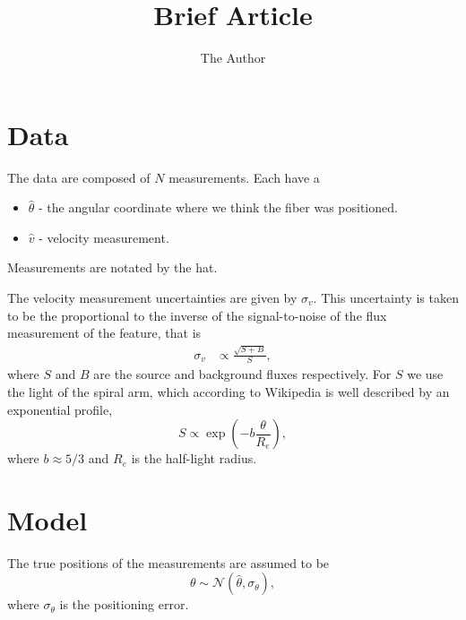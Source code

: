 \documentclass[11pt, oneside]{article}   	%
\title{Brief Article}
\author{The Author}
\begin{document}
\maketitle

\section{Data}
The data are composed of $N$ measurements.  Each have a
\begin{itemize}
\item $\hat{\theta}$ - the angular coordinate where we think the fiber was positioned.
\item $\hat{v}$ - velocity measurement.
\end{itemize}
Measurements are notated by the hat.

The velocity measurement uncertainties are given by $\sigma_v$.  
This uncertainty is taken to be the proportional to the inverse of the signal-to-noise of the flux measurement of the feature, that is
\begin{align*}
\sigma_v & \propto \frac{\sqrt{S + B}}{S},
\end{align*}
where $S$ and $B$ are the source and background fluxes respectively.
For $S$ we use the light of the spiral arm, which according to Wikipedia is well described by an exponential profile,
\begin{equation}
S \propto \exp{\left(-b \frac{\theta}{R_e}\right)},
\end{equation}
where $b \approx 5/3$ and $R_e$ is the half-light radius.



\section{Model}
The true positions of the measurements are assumed to be
\begin{equation}
\theta \sim \mathcal{N}(\hat{\theta},\sigma_\theta),
\end{equation}
where $\sigma_\theta$ is the positioning error.
\end{document}

